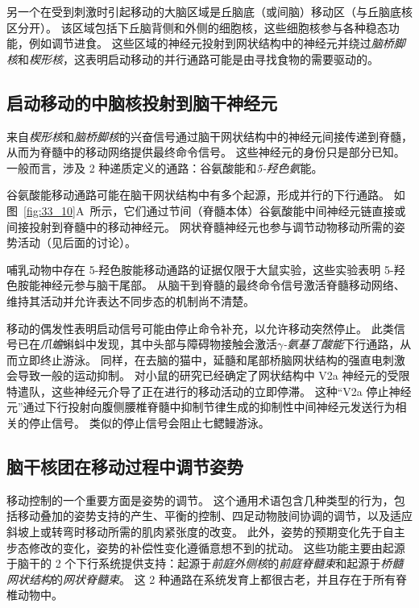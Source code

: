 另一个在受到刺激时引起移动的大脑区域是丘脑底（或间脑）移动区（与丘脑底核区分开）。
该区域包括下丘脑背侧和外侧的细胞核，这些细胞核参与各种稳态功能，例如调节进食。
这些区域的神经元投射到网状结构中的神经元并绕过\textit{脑桥脚核}和\textit{楔形核}，这表明启动移动的并行通路可能是由寻找食物的需要驱动的。



\subsection{启动移动的中脑核投射到脑干神经元}

来自\textit{楔形核}和\textit{脑桥脚核}的兴奋信号通过脑干网状结构中的神经元间接传递到脊髓，从而为脊髓中的移动网络提供最终命令信号。
这些神经元的身份只是部分已知。
一般而言，涉及 2 种递质定义的通路：谷氨酸能和\textit{5-羟色氨}能。


谷氨酸能移动通路可能在脑干网状结构中有多个起源，形成并行的下行通路。
如图~\ref{fig:33_10}A~所示，它们通过节间（脊髓本体）谷氨酸能中间神经元链直接或间接投射到脊髓中的移动神经元。
网状脊髓神经元也参与调节动物移动所需的姿势活动（见后面的讨论）。


哺乳动物中存在 5-羟色胺能移动通路的证据仅限于大鼠实验，这些实验表明 5-羟色胺能神经元参与脑干尾部。
从脑干到脊髓的最终命令信号激活脊髓移动网络、维持其活动并允许表达不同步态的机制尚不清楚。


移动的偶发性表明启动信号可能由停止命令补充，以允许移动突然停止。
此类信号已在\textit{爪蟾}蝌蚪中发现，其中头部与障碍物接触会激活\textit{$\gamma$-氨基丁酸能}下行通路，从而立即终止游泳。
同样，在去脑的猫中，延髓和尾部桥脑网状结构的强直电刺激会导致一般的运动抑制。
对小鼠的研究已经确定了网状结构中 V2a 神经元的受限特遣队，这些神经元介导了正在进行的移动活动的立即停滞。
这种“V2a 停止神经元”通过下行投射向腹侧腰椎脊髓中抑制节律生成的抑制性中间神经元发送行为相关的停止信号。
类似的停止信号会阻止七鳃鳗游泳。



\subsection{脑干核团在移动过程中调节姿势}

移动控制的一个重要方面是姿势的调节。
这个通用术语包含几种类型的行为，包括移动叠加的姿势支持的产生、平衡的控制、四足动物肢间协调的调节，以及适应斜坡上或转弯时移动所需的肌肉紧张度的改变。
此外，姿势的预期变化先于自主步态修改的变化，姿势的补偿性变化遵循意想不到的扰动。
这些功能主要由起源于脑干的 2 个下行系统提供支持：起源于\textit{前庭外侧核}的\textit{前庭脊髓束}和起源于\textit{桥髓网状结构}的\textit{网状脊髓束}。
这 2 种通路在系统发育上都很古老，并且存在于所有脊椎动物中。


